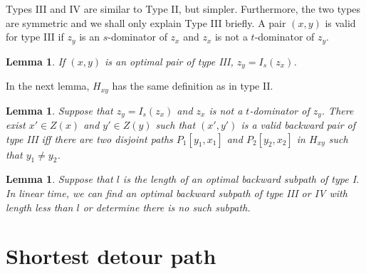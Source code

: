 \documentclass[review]{elsarticle}
\def\squarebox#1{\hbox to #1{\hfill\vbox to #1{\vfill}}}
\renewcommand{\qed}{\hspace*{\fill}
            \vbox{\hrule\hbox{\vrule\squarebox{.667em}\vrule}\hrule}\smallskip\newline}
\newtheorem{lem}[thm]{Lemma}
\begin{document}
Types III and IV are similar to Type II, but simpler. Furthermore,
the two types are symmetric and we shall only explain Type III
briefly. A pair $(x,y)$ is valid for type III if $z_y$ is an
$s$-dominator of $z_x$ and $z_x$ is not a $t$-dominator of $z_y$.
\begin{lem}\label{type3}
If $(x,y)$ is an optimal pair of type III, $z_y=I_s(z_x)$.
\end{lem}
In the next lemma, $H_{xy}$ has the same definition as in type II.
\begin{lem}\label{type3iff}
Suppose that $z_y=I_s(z_x)$ and $z_x$ is not a $t$-dominator of
$z_y$. There exist $x'\in Z(x)$ and $y'\in Z(y)$ such that $(x',y')$
is a valid backward pair of type III iff there are two disjoint
paths $P_1[y_1,x_1]$ and $P_2[y_2,x_2]$ in $H_{xy}$ such that
$y_1\neq y_2$.
\end{lem}

\begin{lem}\label{type34t}
Suppose that $l$ is the length of an optimal backward subpath of
type I. In linear time, we can find an optimal backward subpath of
type III or IV with length less than $l$ or determine there is no
such subpath.
\end{lem}

\section{Shortest detour path}
\end{document}
